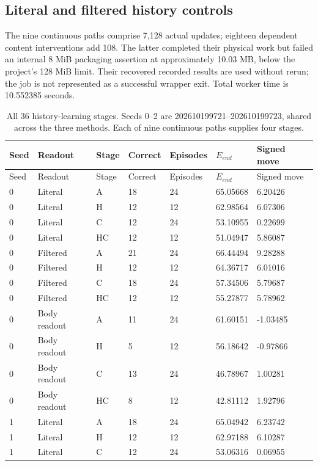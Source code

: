 \subsection*{Literal and filtered history controls}
The nine continuous paths comprise 7,128 actual updates; eighteen dependent content interventions add 108. The latter completed their physical work but failed an internal 8 MiB packaging assertion at approximately 10.03 MB, below the project's 128 MiB limit. Their recovered recorded results are used without rerun; the job is not represented as a successful wrapper exit. Total worker time is 10.552385 seconds.
\begingroup\scriptsize\setlength{\tabcolsep}{3pt}\setlength{\LTpre}{6pt}\setlength{\LTpost}{6pt}
\begin{longtable}{lllllll}
\caption{All 36 history-learning stages. Seeds 0--2 are 202610199721--202610199723, shared across the three methods. Each of nine continuous paths supplies four stages.}\label{tab:history-stages}\\
\toprule
Seed & Readout & Stage & Correct & Episodes & $E_{end}$ & Signed move \\
\midrule
\endfirsthead
\toprule
Seed & Readout & Stage & Correct & Episodes & $E_{end}$ & Signed move \\
\midrule
\endhead
0 & Literal & A & 18 & 24 & 65.05668 & 6.20426 \\
0 & Literal & H & 12 & 12 & 62.98564 & 6.07306 \\
0 & Literal & C & 12 & 24 & 53.10955 & 0.22699 \\
0 & Literal & HC & 12 & 12 & 51.04947 & 5.86087 \\
0 & Filtered & A & 21 & 24 & 66.44494 & 9.28288 \\
0 & Filtered & H & 12 & 12 & 64.36717 & 6.01016 \\
0 & Filtered & C & 18 & 24 & 57.34506 & 5.79687 \\
0 & Filtered & HC & 12 & 12 & 55.27877 & 5.78962 \\
0 & Body readout & A & 11 & 24 & 61.60151 & -1.03485 \\
0 & Body readout & H & 5 & 12 & 56.18642 & -0.97866 \\
0 & Body readout & C & 13 & 24 & 46.78967 & 1.00281 \\
0 & Body readout & HC & 8 & 12 & 42.81112 & 1.92796 \\
1 & Literal & A & 18 & 24 & 65.04942 & 6.23742 \\
1 & Literal & H & 12 & 12 & 62.97188 & 6.10287 \\
1 & Literal & C & 12 & 24 & 53.06316 & 0.06955 \\

\end{longtable}

